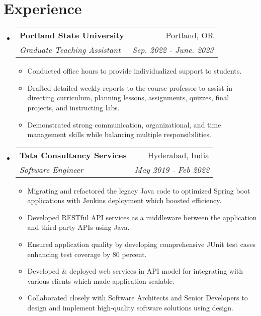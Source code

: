 \documentclass[letterpaper,11pt]{article}
\makeatletter
\newcommand{\resumeSubheading}[4]{
  \vspace{-1pt}\item
    \begin{tabular*}{0.97\textwidth}{l@{\extracolsep{\fill}}r}
      \textbf{#1} & #2 \\
      \textit{\small#3} & \textit{\small #4} \\
    \end{tabular*}\vspace{-5pt}
}
\newcommand{\resumeSubHeadingListStart}{\begin{itemize}[leftmargin=*]}
\newcommand{\resumeSubHeadingListEnd}{\end{itemize}}
\newcommand{\resumeItemListStart}{\begin{itemize}}
\newcommand{\resumeItemListEnd}{\end{itemize}\vspace{-5pt}}
\makeatother
\begin{document}
\section{Experience}
  \resumeSubHeadingListStart

    \resumeSubheading
      {Portland State University}{Portland, OR}
      {Graduate Teaching Assistant}{Sep. 2022 - June. 2023}
      \resumeItemListStart
        \item {\small Conducted office hours to provide individualized support to students.\vspace{-2pt}}
        \item {\small Drafted detailed weekly reports to the course professor to assist in directing curriculum, planning lessons, assignments, quizzes, final projects, and instructing labs.\vspace{-2pt}}
        \item {\small Demonstrated strong communication, organizational, and time management skills while balancing multiple responsibilities.\vspace{-2pt}}
      \resumeItemListEnd

    \resumeSubheading
      {Tata Consultancy Services}{Hyderabad, India}
      {Software Engineer}{May 2019 - Feb 2022}
      \resumeItemListStart
        \item {\small Migrating and refactored the legacy Java code to optimized Spring boot applications with Jenkins deployment which boosted efficiency.\vspace{-2pt}}
        \item {\small Developed RESTful API services as a middleware between the application and third-party APIs using Java.\vspace{-2pt}}
        \item {\small Ensured application quality by developing comprehensive JUnit test cases enhancing test coverage by 80 percent. \vspace{-2pt}}
        \item {\small Developed \& deployed web services in API model for integrating with various clients which made application scalable. \vspace{-2pt}}
        \item {\small Collaborated closely with Software Architects and Senior Developers to design and implement high-quality software solutions using design. \vspace{-2pt}}
      \resumeItemListEnd
  \resumeSubHeadingListEnd
\end{document}
